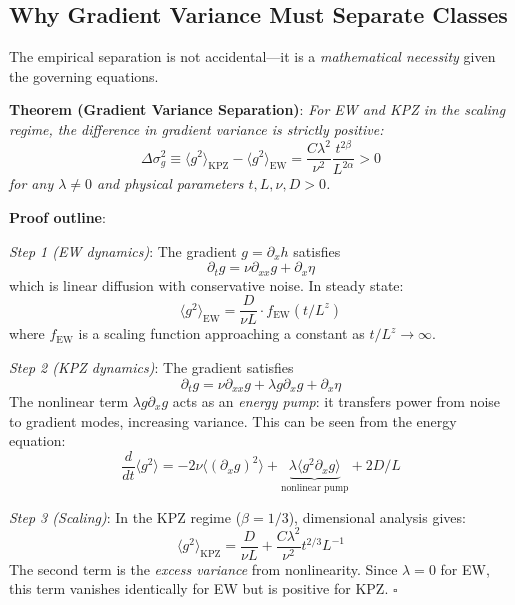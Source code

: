 \documentclass[aps,pre,twocolumn,superscriptaddress,showpacs,longbibliography]{revtex4-2}
\begin{document}
\subsection{Why Gradient Variance Must Separate Classes}

The empirical separation is not accidental---it is a \emph{mathematical necessity} given the governing equations.

\textbf{Theorem (Gradient Variance Separation)}: \emph{For EW and KPZ in the scaling regime, the difference in gradient variance is strictly positive:}
\begin{equation}
\Delta\sigma_g^2 \equiv \langle g^2 \rangle_{\text{KPZ}} - \langle g^2 \rangle_{\text{EW}} = \frac{C\lambda^2}{\nu^2} \frac{t^{2\beta}}{L^{2\alpha}} > 0
\label{eq:theorem}
\end{equation}
\emph{for any $\lambda \neq 0$ and physical parameters $t, L, \nu, D > 0$.}

\textbf{Proof outline}:

\emph{Step 1 (EW dynamics)}: The gradient $g = \partial_x h$ satisfies
\begin{equation}
\partial_t g = \nu \partial_{xx} g + \partial_x \eta
\end{equation}
which is linear diffusion with conservative noise. In steady state:
\begin{equation}
\langle g^2 \rangle_{\text{EW}} = \frac{D}{\nu L} \cdot f_{\text{EW}}(t/L^z)
\end{equation}
where $f_{\text{EW}}$ is a scaling function approaching a constant as $t/L^z \to \infty$.

\emph{Step 2 (KPZ dynamics)}: The gradient satisfies
\begin{equation}
\partial_t g = \nu \partial_{xx} g + \lambda g \partial_x g + \partial_x \eta
\end{equation}
The nonlinear term $\lambda g \partial_x g$ acts as an \emph{energy pump}: it transfers power from noise to gradient modes, increasing variance. This can be seen from the energy equation:
\begin{equation}
\frac{d}{dt}\langle g^2 \rangle = -2\nu \langle (\partial_x g)^2 \rangle + \underbrace{\lambda \langle g^2 \partial_x g \rangle}_{\text{nonlinear pump}} + 2D/L
\end{equation}

\emph{Step 3 (Scaling)}: In the KPZ regime ($\beta = 1/3$), dimensional analysis gives:
\begin{equation}
\langle g^2 \rangle_{\text{KPZ}} = \frac{D}{\nu L} + \frac{C\lambda^2}{\nu^2} t^{2/3} L^{-1}
\end{equation}
The second term is the \emph{excess variance} from nonlinearity. Since $\lambda = 0$ for EW, this term vanishes identically for EW but is positive for KPZ. $\square$
\end{document}
